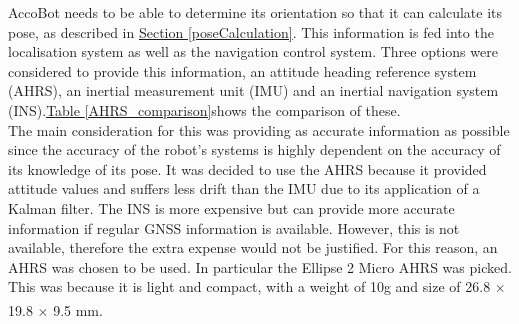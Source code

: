 \documentclass[11pt]{article}		%
\newcommand{\supercite}[1]{\textsuperscript{\cite{#1}}}		%
\newcommand{\tableref}[1]{\hyperref[#1]{Table \ref*{#1}}}     %
\newcommand{\sectref}[1]{\hyperref[#1]{Section \ref*{#1}}}     %
\begin{document}
            AccoBot needs to be able to determine its orientation so that it can calculate its pose, as described in \sectref{poseCalculation}. This information is fed into the localisation system as well as the navigation control system. Three options were considered to provide this information, an attitude heading reference system (AHRS), an inertial measurement unit (IMU) and an inertial navigation system (INS).\tableref{AHRS_comparison}shows the comparison of these. 
          \\ \hspace*{3ex}
            The main consideration for this was providing as accurate information as possible since the accuracy of the robot’s systems is highly dependent on the accuracy of its knowledge of its pose. It was decided to use the AHRS because it provided attitude values and suffers less drift than the IMU due to its application of a Kalman filter. The INS is more expensive but can provide more accurate information if regular GNSS information is available. However, this is not available, therefore the extra expense would not be justified. For this reason, an AHRS was chosen to be used. In particular the Ellipse 2 Micro AHRS was picked. This was because it is light and compact, with a weight of 10g and size of 26.8 $\times$ 19.8 $\times$ 9.5 mm.\supercite{Ellipse_Ahrs}
            \\
            
\end{document}
